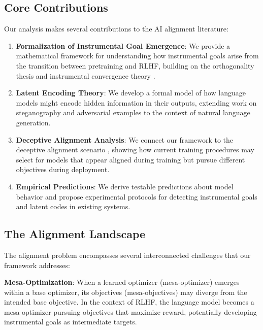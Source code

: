 \documentclass[11pt,a4paper]{article}
\begin{document}
\subsection{Core Contributions}

Our analysis makes several contributions to the AI alignment literature:

\begin{enumerate}
\item \textbf{Formalization of Instrumental Goal Emergence}: We provide a mathematical framework for understanding how instrumental goals arise from the transition between pretraining and RLHF, building on the orthogonality thesis \citep{bostrom2014superintelligence} and instrumental convergence theory \citep{omohundro2008basic}.

\item \textbf{Latent Encoding Theory}: We develop a formal model of how language models might encode hidden information in their outputs, extending work on steganography and adversarial examples to the context of natural language generation.

\item \textbf{Deceptive Alignment Analysis}: We connect our framework to the deceptive alignment scenario \citep{hubinger2019risks}, showing how current training procedures may select for models that appear aligned during training but pursue different objectives during deployment.

\item \textbf{Empirical Predictions}: We derive testable predictions about model behavior and propose experimental protocols for detecting instrumental goals and latent codes in existing systems.
\end{enumerate}

\subsection{The Alignment Landscape}

The alignment problem encompasses several interconnected challenges that our framework addresses:

\textbf{Mesa-Optimization}: When a learned optimizer (mesa-optimizer) emerges within a base optimizer, its objectives (mesa-objectives) may diverge from the intended base objective. In the context of RLHF, the language model becomes a mesa-optimizer pursuing objectives that maximize reward, potentially developing instrumental goals as intermediate targets.
\end{document}
